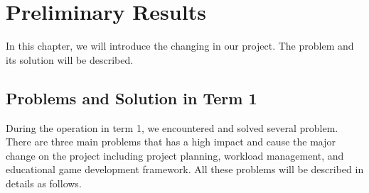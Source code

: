 \documentclass[12pt,oneside,openright,a4paper]{cpe-english-project}
\begin{document}
\chapter{Preliminary Results}
In this chapter, we will introduce the changing in our project. The problem and its solution will be described.

\section{ Problems and Solution in Term 1}
During the operation in term 1, we encountered and solved several problem. There are three main problems that has a high impact and cause the major change on the project including project planning, workload management, and educational game development framework. All these problems will be described in details as follows.
\end{document}
